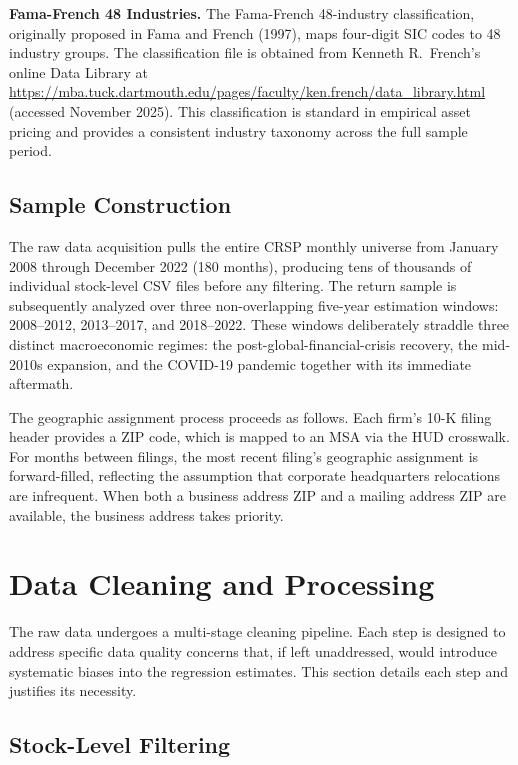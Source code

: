 \documentclass[
  12pt,
]{article}
\begin{document}
\textbf{Fama-French 48 Industries.} The Fama-French 48-industry
classification, originally proposed in Fama and French (1997), maps
four-digit SIC codes to 48 industry groups. The classification file is
obtained from Kenneth R.~French's online Data Library at
\url{https://mba.tuck.dartmouth.edu/pages/faculty/ken.french/data_library.html}
(accessed November 2025). This classification is standard in empirical
asset pricing and provides a consistent industry taxonomy across the
full sample period.

\subsection{Sample Construction}\label{sample-construction}

The raw data acquisition pulls the entire CRSP monthly universe from
January 2008 through December 2022 (180 months), producing tens of
thousands of individual stock-level CSV files before any filtering. The
return sample is subsequently analyzed over three non-overlapping
five-year estimation windows: 2008--2012, 2013--2017, and 2018--2022.
These windows deliberately straddle three distinct macroeconomic
regimes: the post-global-financial-crisis recovery, the mid-2010s
expansion, and the COVID-19 pandemic together with its immediate
aftermath.

The geographic assignment process proceeds as follows. Each firm's 10-K
filing header provides a ZIP code, which is mapped to an MSA via the HUD
crosswalk. For months between filings, the most recent filing's
geographic assignment is forward-filled, reflecting the assumption that
corporate headquarters relocations are infrequent. When both a business
address ZIP and a mailing address ZIP are available, the business
address takes priority.

\section{Data Cleaning and
Processing}\label{data-cleaning-and-processing}

The raw data undergoes a multi-stage cleaning pipeline. Each step is
designed to address specific data quality concerns that, if left
unaddressed, would introduce systematic biases into the regression
estimates. This section details each step and justifies its necessity.

\subsection{Stock-Level Filtering}\label{stock-level-filtering}
\end{document}
